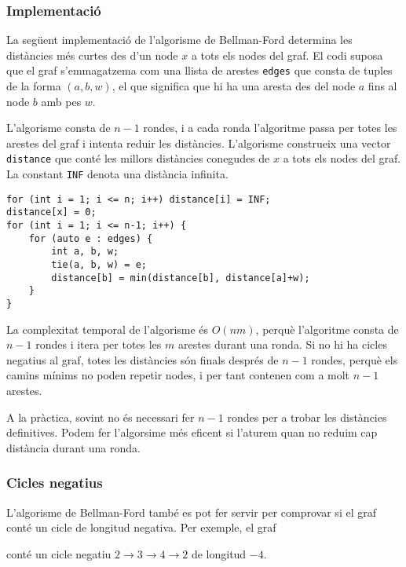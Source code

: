 \subsubsection{Implementació}

La següent implementació de l'algorisme de Bellman-Ford determina les
distàncies més curtes des d'un node $x$ a tots els nodes del graf. El
codi suposa que el graf s'emmagatzema com una llista de arestes
\texttt{edges} que consta de tuples de la forma $(a,b,w)$, el que
significa que hi ha una aresta des del node $a$ fins al node $b$ amb
pes $w$.

L'algorisme consta de $n-1$ rondes, i a cada ronda l'algoritme passa
per totes les arestes del graf i intenta reduir les
distàncies. L'algorisme construeix una vector \texttt{distance} que
conté les millors distàncies conegudes de $x$ a tots els nodes del
graf. La constant \texttt{INF} denota una distància infinita.


\begin{lstlisting}
for (int i = 1; i <= n; i++) distance[i] = INF;
distance[x] = 0;
for (int i = 1; i <= n-1; i++) {
    for (auto e : edges) {
        int a, b, w;
        tie(a, b, w) = e;
        distance[b] = min(distance[b], distance[a]+w);
    }
}
\end{lstlisting}


La complexitat temporal de l'algorisme és $O(nm)$, perquè l'algoritme
consta de $n-1$ rondes i itera per totes les $m$ arestes durant una
ronda. Si no hi ha cicles negatius al graf, totes les distàncies són
finals després de $n-1$ rondes, perquè els camins mínims no poden
repetir nodes, i per tant contenen com a molt $n-1$ arestes.

A la pràctica, sovint no és necessari fer $n-1$ rondes per a trobar
les distàncies definitives. Podem fer l'algorsime més eficent si
l'aturem quan no reduim cap distància durant una ronda.

\subsubsection{Cicles negatius}


L'algorisme de Bellman-Ford també es pot fer servir per comprovar si
el graf conté un cicle de longitud negativa. Per exemple, el graf


\begin{center}
\end{center}
\noindent conté un cicle negatiu $2 \rightarrow 3 \rightarrow 4
\rightarrow 2$ de longitud $-4$.

